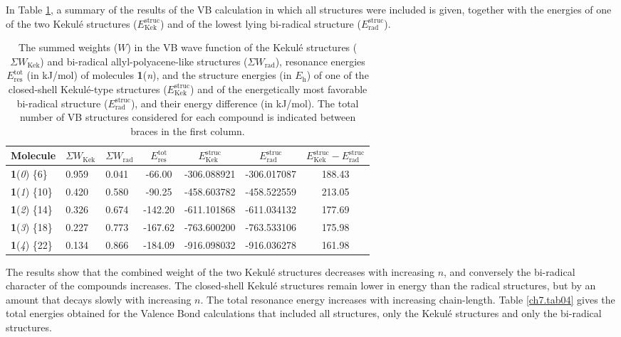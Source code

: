 In Table \ref{ch7.tab03}, a summary of the results of the VB calculation in which all structures were included is given, together with the energies of one of the two Kekul\'e structures ($E^\mathrm{struc}_\mathrm{Kek}$) and of the lowest lying bi-radical structure ($E^\mathrm{struc}_\mathrm{rad}$).
\begin{table}[ht]
\caption{The summed weights ($W$) in the VB wave function of the Kekul\'e structures ($\Sigma W_\mathrm{Kek}$) and bi-radical allyl-polyacene-like structures ($\Sigma W_\mathrm{rad}$), resonance energies $E^\mathrm{tot}_\mathrm{res}$ (in kJ/mol) of molecules \textbf{1}(\textit{n}), and the structure energies (in $E_\mathrm{h}$) of one of the closed-shell Kekul\'e-type structures ($E^\mathrm{struc}_\mathrm{Kek}$) and of the energetically most favorable bi-radical structure ($E^\mathrm{struc}_\mathrm{rad}$), and their energy difference (in kJ/mol). The total number of VB structures considered for each compound is indicated between braces in the first column.}
\begin{center}
\begin{tabular}{l l l c c c c }
\hline
Molecule&
$\Sigma W_\mathrm{Kek}$&
$\Sigma W_\mathrm{rad}$&
$E^\mathrm{tot}_\mathrm{res}$&
$E^\mathrm{struc}_\mathrm{Kek}$&
$E^\mathrm{struc}_\mathrm{rad}$&
$E^\mathrm{struc}_\mathrm{Kek} - E^\mathrm{struc}_\mathrm{rad}$\\
\hline
\textbf{1}(\textit{0}) \{6\}  & 0.959 & 0.041 & -66.00 & -306.088921 & -306.017087 & 188.43\\
\textbf{1}(\textit{1}) \{10\} & 0.420 & 0.580 & -90.25 & -458.603782 & -458.522559 & 213.05\\
\textbf{1}(\textit{2}) \{14\} & 0.326 & 0.674 & -142.20 & -611.101868 & -611.034132 & 177.69\\
\textbf{1}(\textit{3}) \{18\} & 0.227 & 0.773 & -167.62 & -763.600200 & -763.533106 & 175.98\\
\textbf{1}(\textit{4}) \{22\} & 0.134 & 0.866 & -184.09 & -916.098032 & -916.036278 & 161.98\\
\hline
\end{tabular}
\end{center}
\label{ch7.tab03}
\end{table}
The results show that the combined weight of the two Kekul\'e structures decreases with increasing $n$, and conversely the bi-radical character of the compounds increases. The closed-shell Kekul\'e structures remain lower in energy than the radical structures, but by an amount that decays slowly with increasing $n$. The total resonance energy increases with increasing chain-length. Table \ref{ch7.tab04} gives the total energies obtained for the Valence Bond calculations that included all structures, only the Kekul\'e structures and only the bi-radical structures.
